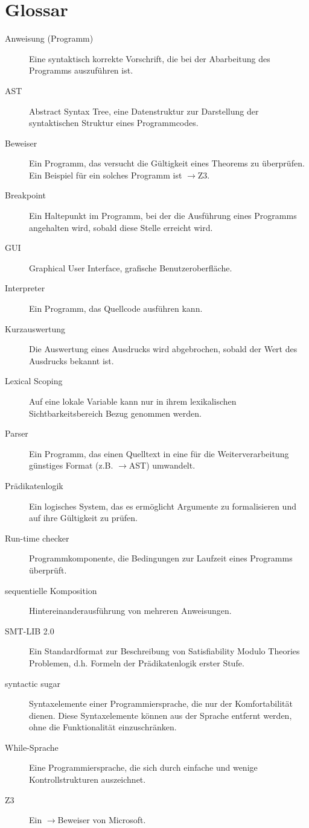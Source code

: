 \documentclass[a4paper,10pt]{article}
\begin{document}
\section{Glossar}
\begin{description}
\item[Anweisung (Programm)] Eine syntaktisch korrekte Vorschrift, die bei der Abarbeitung des Programms auszuf\"{u}hren ist.
\item[AST] Abstract Syntax Tree, eine Datenstruktur zur Darstellung der syntaktischen Struktur eines Programmcodes.
\item[Beweiser] Ein Programm, das versucht die G\"{u}ltigkeit eines Theorems zu \"{u}berpr\"{u}fen. Ein Beispiel f\"{u}r ein solches Programm ist $\to$Z3.
\item[Breakpoint] Ein Haltepunkt im Programm, bei der die Ausf\"{u}hrung eines Programms angehalten wird, sobald diese Stelle erreicht wird.
\item[GUI] Graphical User Interface, grafische Benutzeroberfl\"{a}che.
\item[Interpreter] Ein Programm, das Quellcode ausf\"{u}hren kann.
\item[Kurzauswertung] Die Auswertung eines Ausdrucks wird abgebrochen, sobald der Wert des Ausdrucks bekannt ist.
\item[Lexical Scoping] Auf eine lokale Variable kann nur in ihrem lexikalischen Sichtbarkeitsbereich Bezug genommen werden.
\item[Parser] Ein Programm, das einen Quelltext in eine f\"{u}r die Weiterverarbeitung g\"{u}nstiges Format (z.B. $\to$AST) umwandelt.
\item[Pr\"{a}dikatenlogik] Ein logisches System, das es erm\"{o}glicht Argumente zu formalisieren und auf ihre G\"{u}ltigkeit zu pr\"{u}fen.
\item[Run-time checker] Programmkomponente, die Bedingungen zur Laufzeit eines Programms \"{u}berpr\"{u}ft.
\item[sequentielle Komposition] Hintereinanderausf\"{u}hrung von mehreren Anweisungen.
\item[SMT-LIB 2.0] Ein Standardformat zur Beschreibung von Satisfiability Modulo Theories Problemen, d.h. Formeln der Pr\"{a}dikatenlogik erster Stufe.
\item[syntactic sugar] Syntaxelemente einer Programmiersprache, die nur der Komfortabilit\"{a}t dienen. Diese Syntaxelemente k\"{o}nnen aus der Sprache entfernt werden, ohne die Funktionalit\"{a}t einzuschr\"{a}nken.
\item[While-Sprache] Eine Programmiersprache, die sich durch einfache und wenige Kontrollstrukturen auszeichnet.
\item[Z3] Ein $\to$Beweiser von Microsoft.
\end{description}
\end{document}

